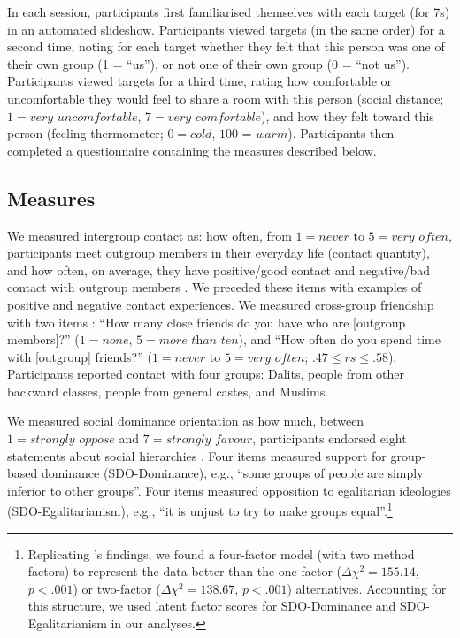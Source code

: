 \documentclass[12pt, a4paper]{article}
\begin{document}
In each session, participants first familiarised themselves with each target (for 7s) in an automated slideshow. Participants viewed targets (in the same order) for a second time, noting for each target whether they felt that this person was one of their own group (1 = ``us''), or not one of their own group (0 = ``not us''). Participants viewed targets for a third time, rating how comfortable or uncomfortable they would feel to share a room with this person (social distance; $1 = \textit{very uncomfortable}$, $7 = \textit{very comfortable}$), and how they felt toward this person (feeling thermometer; $0 = \textit{cold}$, $\textit{100 = warm}$). Participants then completed a questionnaire containing the measures described below. 

\subsection{Measures}

We measured intergroup contact as: how often, from $1 = \textit{never}$ to $5 = \textit{very often}$, participants meet outgroup members in their everyday life (contact quantity), and how often, on average, they have positive/good contact and negative/bad contact with outgroup members \cite{barlow_contact_2012}. We preceded these items with examples of positive and negative contact experiences. We measured cross-group friendship with two items \cite{turner_reducing_2007}: ``How many close friends do you have who are [outgroup members]?'' ($1 = \textit{none}$, $5 = \textit{more than ten}$), and ``How often do you spend time with [outgroup] friends?'' ($1 = \textit{never}$ to $5 = \textit{very often}$; $.47\leq\textit{rs}\leq.58$). Participants reported contact with four groups: Dalits, people from other backward classes, people from general castes, and Muslims.

We measured social dominance orientation as how much, between $1 = \textit{strongly oppose}$ and $7 = \textit{strongly favour}$, participants endorsed eight statements about social hierarchies \cite{ho_nature_2015}. Four items measured support for group-based dominance (SDO-Dominance), e.g., ``some groups of people are simply inferior to other groups''. Four items measured opposition to egalitarian ideologies (SDO-Egalitarianism), e.g., ``it is unjust to try to make groups equal''.\footnote{Replicating \citeauthor{ho_nature_2015}’s \citeyear{ho_nature_2015} findings, we found a four-factor model (with two method factors) to represent the data better than the one-factor ($\Delta\chi^2 = 155.14$, $p < .001$) or two-factor ($\Delta\chi^2 = 138.67$, $p < .001$) alternatives. Accounting for this structure, we used latent factor scores for SDO-Dominance and SDO-Egalitarianism in our analyses.}
\end{document}
